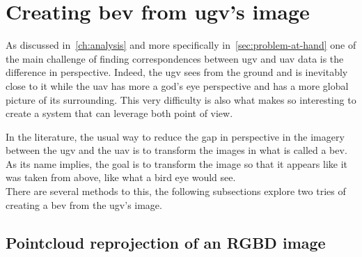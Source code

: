 \chapter{Creating \gls{bev} from \gls{ugv}'s image}\label{ch:creating-bev-from-ugv's-image}


As discussed in~\cref{ch:analysis} and more specifically in~\cref{sec:problem-at-hand} one of the main challenge of
finding correspondences between \gls{ugv} and \gls{uav} data is the difference in perspective.
Indeed, the \gls{ugv} sees from the ground and is inevitably close to it while the \gls{uav} has more a god's eye
perspective and has a more global picture of its surrounding.
This very difficulty is also what makes so interesting to create a system that can leverage both point of view.

In the literature, the usual way to reduce the gap in perspective in the imagery between the \gls{ugv} and the \gls{uav} is to transform
the images in what is called a \gls{bev}.
As its name implies, the goal is to transform the image so that it appears like it was taken from above, like what a
bird eye would see.\\
There are several methods to this, the following subsections explore two tries of creating a \gls{bev} from the
\gls{ugv}'s image.


\section{Pointcloud reprojection of an RGBD image}

